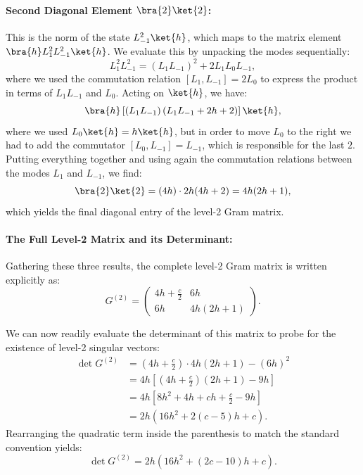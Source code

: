 \paragraph{Second Diagonal Element \(\bra{2}\ket{2}\):}
This is the norm of the state \(L_{-1}^2\ket{h}\), which maps to the matrix element \(\bra{h}L_1^2 L_{-1}^2\ket{h}\). We evaluate this by unpacking the modes sequentially:
\[
    L_1^2 L_{-1}^2 = (L_1 L_{-1})^2 + 2 L_1 L_0 L_{-1},
\]
where we used the commutation relation \([L_1, L_{-1}] = 2L_0\) to express the product in terms of \(L_1 L_{-1}\) and \(L_0\). Acting on \(\ket{h}\), we have:
\[
    \bra{h} \left[ (L_1 L_{-1})\left(L_1 L_{-1} + 2h + 2\right) \right] \ket{h},
\]
where we used \(L_0\ket{h} = h\ket{h}\), but in order to move \(L_0\) to the right we had to add the commutator \([L_0, L_{-1}] = L_{-1}\), which is responsible for the last \(2\). Putting everything together and using again the commutation relations between the modes \(L_1\) and \(L_{-1}\), we find:
\[
    \bra{2}\ket{2} = \left(4h\right) \cdot 2h(4h+2) = 4h(2h+1),
\]
which yields the final diagonal entry of the level-2 Gram matrix.

\paragraph{The Full Level-2 Matrix and its Determinant:}
Gathering these three results, the complete level-2 Gram matrix is written explicitly as:
\[
    G^{(2)} = \begin{pmatrix}
        4h + \frac{c}{2} & 6h       \\
        6h               & 4h(2h+1)
    \end{pmatrix}.
\]

We can now readily evaluate the determinant of this matrix to probe for the existence of level-2 singular vectors:
\[
    \begin{aligned}
        \det G^{(2)} & = \left(4h + \frac{c}{2}\right) \cdot 4h(2h+1) - (6h)^2 \\
                     & = 4h \left[ (4h + \frac{c}{2})(2h+1) - 9h \right]       \\
                     & = 4h \left[ 8h^2 + 4h + ch + \frac{c}{2} - 9h \right]   \\
                     & = 2h \left( 16h^2 + 2(c-5)h + c \right).
    \end{aligned}
\]
Rearranging the quadratic term inside the parenthesis to match the standard convention yields:
\[
    \det G^{(2)} = 2h \left( 16h^2 + (2c - 10)h + c \right).
\]

